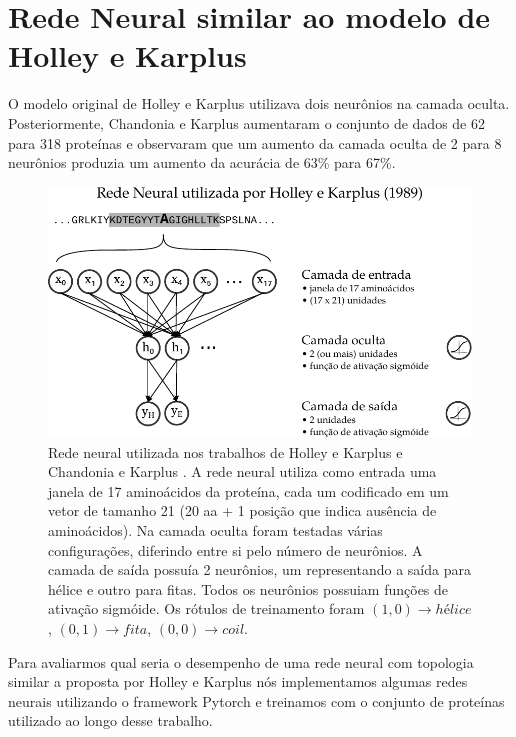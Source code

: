 \section{Rede Neural similar ao modelo de Holley e Karplus}

O modelo original de Holley e Karplus \citeyear{key} utilizava dois neurônios na camada oculta. Posteriormente, Chandonia e Karplus \citeyear{10.1002/pro.5560050422} aumentaram o conjunto de dados de 62 para 318 proteínas e observaram que um aumento da camada oculta de 2 para 8 neurônios produzia um aumento da acurácia de 63\% para 67\%.

\begin{figure}
    \includegraphics[width=\linewidth]{../figures/neural_network_HK.pdf}
    \caption{Rede neural utilizada nos trabalhos de Holley e Karplus \citeyear{key} e  Chandonia e Karplus \citeyear{10.1002/pro.5560050422}. A rede neural utiliza como entrada uma janela de 17 aminoácidos da proteína, cada um codificado em um vetor de tamanho 21 (20 aa + 1 posição que indica ausência de aminoácidos). Na camada oculta foram testadas várias configurações, diferindo entre si pelo número de neurônios. A camada de saída possuía 2 neurônios, um representando a saída para hélice e outro para fitas. Todos os neurônios possuiam funções de ativação sigmóide. Os rótulos de treinamento foram $(1,0) \rightarrow hélice$, $(0,1) \rightarrow fita$, $(0,0) \rightarrow coil$.}
    \label{fig:neural_network_HK}
\end{figure}

Para avaliarmos qual seria o desempenho de uma rede neural com topologia similar a proposta por Holley e Karplus \citeyear{key} nós implementamos algumas redes neurais utilizando o framework Pytorch e treinamos com o conjunto de proteínas utilizado ao longo desse trabalho.

